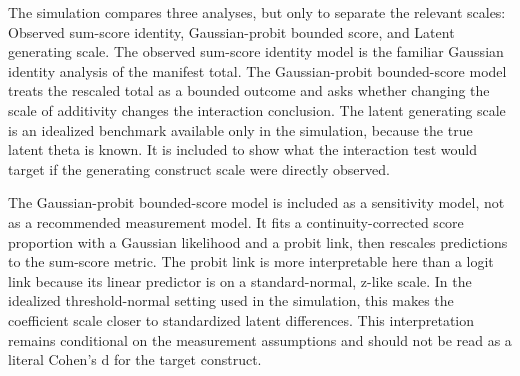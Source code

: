 \documentclass[
  man,
  longtable,
  nolmodern,
  notxfonts,
  notimes,
  colorlinks=true,linkcolor=blue,citecolor=blue,urlcolor=blue]{apa7}
\begin{document}
The simulation compares three analyses, but only to separate the
relevant scales: Observed sum-score identity, Gaussian-probit bounded
score, and Latent generating scale. The observed sum-score identity
model is the familiar Gaussian identity analysis of the manifest total.
The Gaussian-probit bounded-score model treats the rescaled total as a
bounded outcome and asks whether changing the scale of additivity
changes the interaction conclusion. The latent generating scale is an
idealized benchmark available only in the simulation, because the true
latent theta is known. It is included to show what the interaction test
would target if the generating construct scale were directly observed.

The Gaussian-probit bounded-score model is included as a sensitivity
model, not as a recommended measurement model. It fits a
continuity-corrected score proportion with a Gaussian likelihood and a
probit link, then rescales predictions to the sum-score metric. The
probit link is more interpretable here than a logit link because its
linear predictor is on a standard-normal, z-like scale. In the idealized
threshold-normal setting used in the simulation, this makes the
coefficient scale closer to standardized latent differences. This
interpretation remains conditional on the measurement assumptions and
should not be read as a literal Cohen's d for the target construct.
\end{document}
